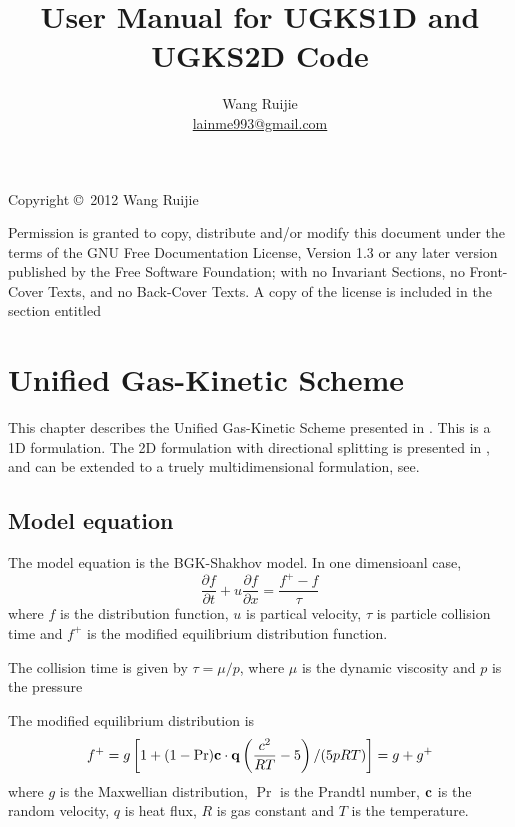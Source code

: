 \documentclass[a4paper]{book}
\begin{document}
\title{User Manual for UGKS1D and UGKS2D Code}
\author{Wang Ruijie\\\href{mailto:lainme993@gmail.com}{lainme993@gmail.com}}
\maketitle

\thispagestyle{empty}
Copyright \copyright\ 2012 Wang Ruijie

Permission is granted to copy, distribute and/or modify this document
under the terms of the GNU Free Documentation License, Version 1.3 or
any later version published by the Free Software Foundation; with no
Invariant Sections, no Front-Cover Texts, and no Back-Cover Texts.  A
copy of the license is included in the section entitled

\frontmatter
\tableofcontents

\mainmatter

\chapter{Unified Gas-Kinetic Scheme}
This chapter describes the Unified Gas-Kinetic Scheme presented in \cite{Xu2010,Xu2011}. This is a 1D formulation. The 2D formulation with directional splitting is presented in \cite{Huang2012}, and can be extended to a truely multidimensional formulation, see\cite{Xu2005}.

\section{Model equation}
The model equation is the BGK-Shakhov model. In one dimensioanl case,
\begin{equation}
    \label{eq:bgk-shakhov}
    \frac{\partial f}{\partial t}+u\frac{\partial f}{\partial x}=\frac{f^+-f}{\tau}
\end{equation}
where $f$ is the distribution function, $u$ is partical velocity, $\tau$ is particle collision time and $f^+$ is the modified equilibrium distribution function.

The collision time is given by $\tau=\mu/p$, where $\mu$ is the dynamic viscosity and $p$ is the pressure

The modified equilibrium distribution is
\begin{equation}
    f^+ = g\left[1+(1-\Pr){\bf c}\cdot{\bf q}\left(\frac{c^2}{RT}-5\right)/(5pRT)\right]=g+g^+
\end{equation}
where $g$ is the Maxwellian distribution, $\Pr$ is the Prandtl number, ${\bf c}$ is the random velocity, $q$ is heat flux, $R$ is gas constant and $T$ is the temperature.
\end{document}
